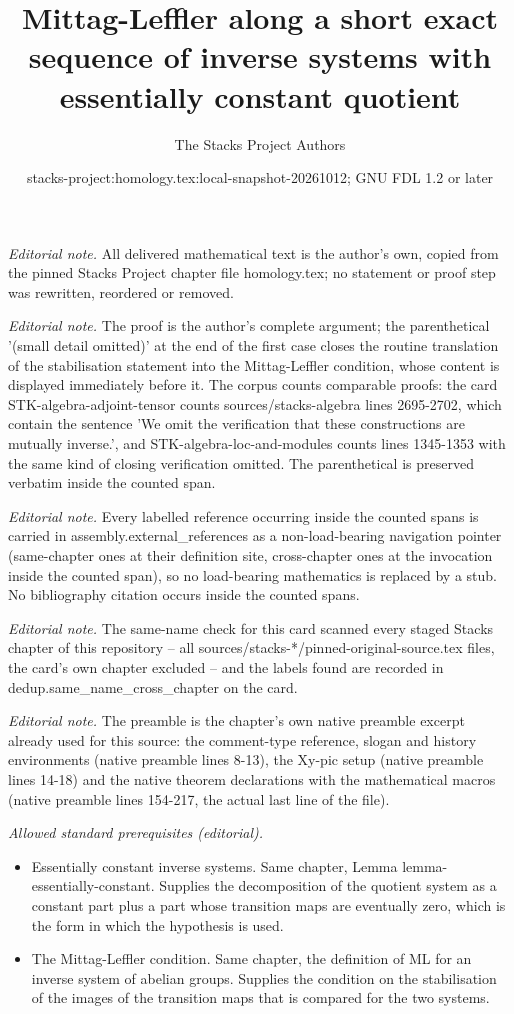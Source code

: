 \documentclass[10pt,a4paper]{amsart}
\title{Mittag-Leffler along a short exact sequence of inverse systems with essentially constant quotient}
\author{The Stacks Project Authors}
\date{stacks-project:homology.tex:local-snapshot-20261012; GNU FDL 1.2 or later}
\theoremstyle{plain}
\theoremstyle{definition}
\theoremstyle{remark}
\numberwithin{equation}{subsection}
\begin{document}
\maketitle
\noindent\textit{Editorial note.} All delivered mathematical text is the author's own, copied from the pinned Stacks Project chapter file homology.tex; no statement or proof step was rewritten, reordered or removed.\par\medskip
\noindent\textit{Editorial note.} The proof is the author's complete argument; the parenthetical '(small detail omitted)' at the end of the first case closes the routine translation of the stabilisation statement into the Mittag-Leffler condition, whose content is displayed immediately before it. The corpus counts comparable proofs: the card STK-algebra-adjoint-tensor counts sources/stacks-algebra lines 2695-2702, which contain the sentence 'We omit the verification that these constructions are mutually inverse.', and STK-algebra-loc-and-modules counts lines 1345-1353 with the same kind of closing verification omitted. The parenthetical is preserved verbatim inside the counted span.\par\medskip
\noindent\textit{Editorial note.} Every labelled reference occurring inside the counted spans is carried in assembly.external\_references as a non-load-bearing navigation pointer (same-chapter ones at their definition site, cross-chapter ones at the invocation inside the counted span), so no load-bearing mathematics is replaced by a stub. No bibliography citation occurs inside the counted spans.\par\medskip
\noindent\textit{Editorial note.} The same-name check for this card scanned every staged Stacks chapter of this repository -- all sources/stacks-*/pinned-original-source.tex files, the card's own chapter excluded -- and the labels found are recorded in dedup.same\_name\_cross\_chapter on the card.\par\medskip
\noindent\textit{Editorial note.} The preamble is the chapter's own native preamble excerpt already used for this source: the comment-type reference, slogan and history environments (native preamble lines 8-13), the Xy-pic setup (native preamble lines 14-18) and the native theorem declarations with the mathematical macros (native preamble lines 154-217, the actual last line of the file).\par\medskip
\noindent\textit{Allowed standard prerequisites (editorial).}\begin{itemize}
\item Essentially constant inverse systems. Same chapter, Lemma lemma-essentially-constant. Supplies the decomposition of the quotient system as a constant part plus a part whose transition maps are eventually zero, which is the form in which the hypothesis is used.
\item The Mittag-Leffler condition. Same chapter, the definition of ML for an inverse system of abelian groups. Supplies the condition on the stabilisation of the images of the transition maps that is compared for the two systems.
\end{itemize}\medskip
\end{document}
